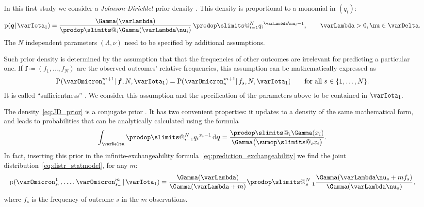 \documentclass[\ifafour a4paper,12pt,\else a5paper,10pt,\fi%
onecolumn,oneside,article,%
british%
]{memoir}
\makeatletter
\theoremstyle{remark}
\theoremstyle{innote}
\def\sum{\DOTSI\sumop\slimits@}
\def\prod{\DOTSI\prodop\slimits@}
\let\parentext=\parentexttrack%
\newcommand*{\citep}{\parencites}
\newcommand*{\citey}{\parencites*}
\renewcommand*{\cites}{\parencites}
\newcommand*{\di}{\mathrm{d}}%
\newcommand*{\defd}{\coloneqq}
\DeclarePairedDelimiter\set{\{}{\}}
\newcommand*{\pf}{\mathrm{p}}%
\newcommand*{\p}{\mathrm{P}}%
\renewcommand*{\|}{\mathpunct{|}}
\newcommand*{\chap}{ch.}%
\newcommand*{\tsum}{\mathop{\textstyle\sum}\nolimits}
\newcommand*{\simpl}{\varDelta}
\newcommand*{\yqq}{q}
\newcommand*{\yq}{\bm{\yqq}}
\newcommand*{\yff}{f}
\newcommand*{\yf}{\bm{\yff}}
\newcommand*{\yI}{\varIota}
\newcommand*{\yMJ}{\yI_1}
\newcommand*{\yN}{\varLambda}
\newcommand*{\ynn}{\nu}
\makeatother
\begin{document}
In this first study we consider a \emph{Johnson-Dirichlet} prior density
\parentext{references below}. This density is proportional to a monomial
in $(\yqq_i)$:
\begin{equation}
  \label{eq:JD_prior}
  \pf(\yq \| \yMJ) =
  \frac{\Gamma(\yN)}{\prod_i \Gamma(\yN\ynn_i)}\,
  \prod_{i=1}^N{\yqq_i}^{\yN\ynn_i-1}, \qquad \yN>0, \ynn \in \simpl.
\end{equation}
The $N$ independent parameters $(\yN, \ynn)$ need to be specified by
additional assumptions.

Such prior density is determined by the assumption that that the
frequencies of other outcomes are irrelevant for predicting a particular
one. If $\yf \defd (\yff_{1},\dotsc,\yff_{N})$ are the observed
outcomes' relative frequencies, this assumption can be mathematically
expressed as
\begin{equation}
  \label{eq:sufficientness}
  \p(\varOmicron^{m+1}_s \| \yf, N, \yMJ) =
  \p(\varOmicron^{m+1}_{s} \| \yff_{s}, N, \yMJ)
  \qquad\text{for all } s\in\set{1,\dotsc, N}.
\end{equation}
It is called \enquote{sufficientness}
\cites{johnson1924,johnson1932c}[\chap~4]{good1965}{zabell1982,jaynes1986d_r1996}.
We consider this assumption and the specification of the parameters above
to be contained in $\yMJ$.


The density~\eqref{eq:JD_prior} is a conjugate prior
\cites[\chap~9]{degroot1970_r2004}{diaconisetal1979b}. It has two
convenient properties: it updates to a density of the same mathematical
form, and leads to probabilities that can be analytically calculated using
the formula
\begin{equation}
  \label{eq:Dirichlet_formula}
  \int_{\simpl} \prod_{i=1}^N {\yqq_{i}}^{x_i-1}\,\di\yq = \frac{\prod_i \Gamma(x_i)}{\Gamma\bigl(\sum_i x_i\bigr)}.
\end{equation}
In fact, inserting this prior in the infinite-exchangeability
formula~\eqref{eq:prediction_exchangeability} we find the joint
distribution~\eqref{eq:distr_statmodel}, for any $m$:
\begin{equation}
  \label{eq:joint_distr_JD}
\pf( \varOmicron^1_{s_1}, \dotsc, \varOmicron^m_{s_m} \| \yMJ) =
  \frac{\Gamma(\yN)}{\Gamma(\yN+m)}
  \prod_{s=1}^{N}\frac{\Gamma(\yN\ynn_s + m\yff_s)}{\Gamma(\yN\ynn_s)},
\end{equation}
where $\yff_s$ is the frequency of outcome $s$ in the $m$ observations.
\end{document}
